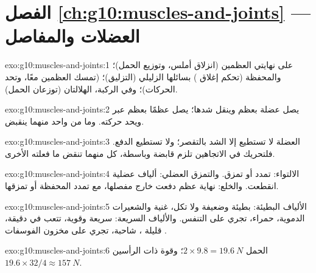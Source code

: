 \section*{الفصل \ref{ch:g10:muscles-and-joints} --- العضلات والمفاصل}

\begin{solution}{exo:g10:muscles-and-joints:1}
 على نهايتي العظمين (انزلاق أملس، وتوزيع الحمل)؛ والمحفظة (تحكم
إغلاق ) بسائلها الزليلي (التزليق)؛  (تمسك العظمين معًا،
وتحد الحركات)؛ وفي الركبة، الهلالتان (توزعان الحمل).
\end{solution}

\begin{solution}{exo:g10:muscles-and-joints:2}
 يصل عضلة بعظم وينقل شدها؛  يصل عظمًا بعظم عبر  ويحد
حركته. وما من واحد منهما ينقبض.
\end{solution}

\begin{solution}{exo:g10:muscles-and-joints:3}
العضلة لا تستطيع إلا الشد بالتقصر؛ ولا تستطيع الدفع. فلتحريك  في
الاتجاهين تلزم قابضة وباسطة، كل منهما تنقض ما فعلته الأخرى.
\end{solution}

\begin{solution}{exo:g10:muscles-and-joints:4}
الالتواء:  تمدد أو تمزق. والتمزق العضلي: ألياف عضلية انقطعت.
والخلع: نهاية عظم دفعت خارج مفصلها، مع تمدد المحفظة  أو
تمزقها.
\end{solution}

\begin{solution}{exo:g10:muscles-and-joints:5}
الألياف البطيئة: بطيئة وضعيفة ولا تكل، غنية  والشعيرات
الدموية، حمراء، تجري على التنفس. والألياف السريعة: سريعة وقوية، تتعب
في دقيقة، قليلة ، شاحبة، تجري على مخزون الفوسفات .
\end{solution}

\begin{solution}{exo:g10:muscles-and-joints:6}
الحمل $2 \times 9.8 = \qty{19.6}{N}$؛ وقوة ذات الرأسين $19.6 \times 32/4
\approx \qty{157}{N}$.
\end{solution}

